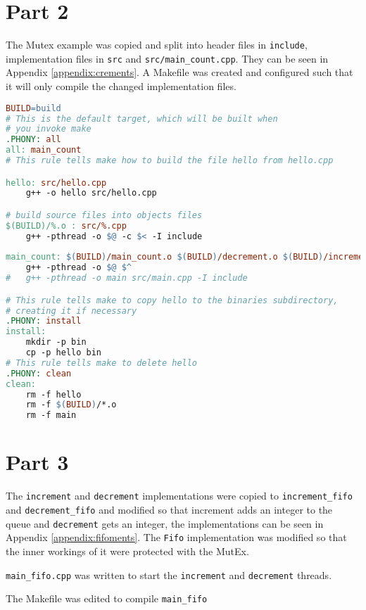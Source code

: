 \documentclass{article}
\begin{document}
\section*{Part 2}
The Mutex example was copied and split into header files in \verb!include!, implementation files in \verb!src! and \verb!src/main_count.cpp!. They can be seen in Appendix \ref{appendix:crements}. A Makefile was created and configured such that it will only compile the changed implementation files.

\begin{lstlisting}[language=makefile, caption={Makefile for compiling Mutex example}]
BUILD=build
# This is the default target, which will be built when 
# you invoke make
.PHONY: all
all: main_count
# This rule tells make how to build the file hello from hello.cpp

hello: src/hello.cpp
	g++ -o hello src/hello.cpp

# build source files into objects files
$(BUILD)/%.o : src/%.cpp
	g++ -pthread -o $@ -c $< -I include
	
main_count: $(BUILD)/main_count.o $(BUILD)/decrement.o $(BUILD)/increment.o
	g++ -pthread -o $@ $^
#	g++ -pthread -o main src/main.cpp -I include

# This rule tells make to copy hello to the binaries subdirectory,
# creating it if necessary
.PHONY: install
install:
	mkdir -p bin
	cp -p hello bin
# This rule tells make to delete hello 
.PHONY: clean 
clean:
	rm -f hello
	rm -f $(BUILD)/*.o
	rm -f main

\end{lstlisting}

\section*{Part 3}
The \verb!increment! and \verb!decrement! implementations were copied to \verb!increment_fifo! and \verb!decrement_fifo! and modified so that increment adds an integer to the queue and \verb!decrement! gets an integer, the implementations can be seen in Appendix \ref{appendix:fifoments}. The \verb!Fifo! implementation was modified so that the inner workings of it were protected with the MutEx.

\verb!main_fifo.cpp! was written to start the \verb!increment! and \verb!decrement! threads. 


The Makefile was edited to compile \verb!main_fifo!

\end{document}
